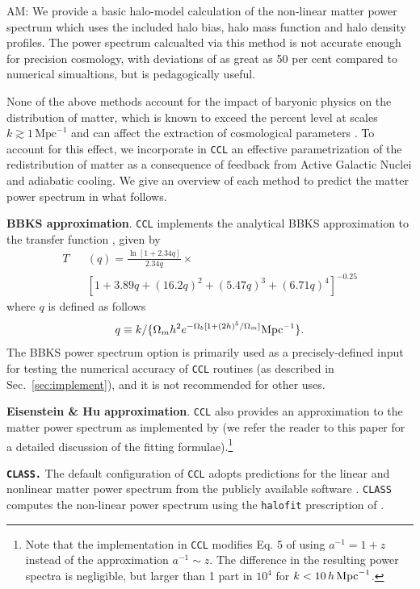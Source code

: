 \documentclass[\docopts]{\docclass}
\newcommand{\Mead}[1]{\textcolor{red!50!cyan}{AM: #1}}
\newcommand{\ccl}{{\tt CCL}\xspace}
\newcommand{\halofit}{{\tt halofit}\xspace}
\newcommand{\class}{{\tt CLASS}\xspace}
\begin{document}
\Mead{We provide a basic halo-model calculation of the non-linear matter power spectrum which uses the included halo bias, halo mass function and halo density profiles. The power spectrum calcualted via this method is not accurate enough for precision cosmology, with deviations of as great as 50 per cent compared to numerical simualtions, but is pedagogically useful.}

None of the above methods account for the impact of baryonic physics on the distribution of matter, which is known to exceed the percent level at scales $k \gtrsim 1\,\text{Mpc}^{-1}$ \citep{vanDaalen11,Illustris,Hellwing16,Springel17} and can affect the extraction of cosmological parameters \citep{Semboloni11,Semboloni13,Mohammed14,Eifler15,Mohammed17}. To account for this effect, we incorporate in \ccl an effective parametrization \citep{Schneider15} of the redistribution of matter as a consequence of feedback from Active Galactic Nuclei and adiabatic cooling. We give an overview of each method to predict the matter power spectrum in what follows.

{\bf BBKS approximation}. \ccl implements the analytical BBKS approximation to the transfer function \citep{BBKS}, given by
\begin{eqnarray}
  \label{eq:bbks}
  T&&(q) = \frac{\ln[1+2.34q]}{2.34q}\times\\
  &&[1+3.89q+(16.2q)^2+(5.47q)^3+(6.71q)^4]^{-0.25}\nonumber
\end{eqnarray}
where $q$ is defined as follows \citep{Sugiyama95}
\begin{equation}
  q \equiv k/\{\Omega_m h^2 e^{-\Omega_b[1+(2h)^5/\Omega_m]}{\rm Mpc}^{-1}\}.
\end{equation}
The BBKS power spectrum option is primarily used as a precisely-defined input for testing the numerical accuracy of \ccl routines (as described in Sec.~\ref{sec:implement}), and it is not recommended for other uses.

{\bf Eisenstein \& Hu approximation}. \ccl also provides an approximation to the matter power spectrum as implemented by \citet{1998ApJ...496..605E} (we refer the reader to this paper for a detailed discussion of the fitting formulae).\footnote{Note that the implementation in \ccl modifies Eq. 5 of \citet{1998ApJ...496..605E} using $a^{-1}=1+z$ instead of the approximation $a^{-1}\sim z$. The difference in the resulting power spectra is negligible, but larger than 1 part in $10^4$ for $k<10\,h\,{\rm Mpc}^{-1}$.}

{\bf \tt CLASS.} The default configuration of \ccl adopts predictions for the linear and nonlinear matter power spectrum from the publicly available software \citep{class}. \class computes the non-linear power spectrum using the \halofit prescription of \cite{CLASS_halofit}.
\end{document}
